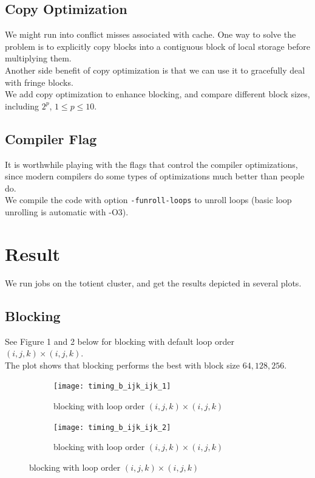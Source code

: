 \documentclass[12pt]{article}
\numberwithin{equation}{section}
\begin{document}
\subsection{Copy Optimization}

We might run into conflict misses associated with cache. One way to solve the problem is to explicitly copy blocks into a contiguous block of local storage before multiplying them.
\\
Another side benefit of copy optimization is that we can use it to gracefully deal with fringe blocks.
\\
We add copy optimization to enhance blocking, and compare different block sizes, including $2^p$, $1 \leq p \leq 10$.

\subsection{Compiler Flag}

It is worthwhile playing with the flags that control the compiler optimizations, since modern compilers do some types of optimizations much better than people do.
\\
We compile the code with option \texttt{-funroll-loops} to unroll loops (basic loop unrolling is automatic with -O3).

\section{Result}

We run jobs on the totient cluster, and get the results depicted in several plots.

\subsection{Blocking}

See Figure 1 and 2 below for blocking with default loop order $(i, j, k)\times(i, j, k)$.
\\
The plot shows that blocking performs the best with block size $64, 128, 256$.

\begin{figure}[!ht]
   \begin{subfigure}
      \centering
        \begin{center}
      \texttt{[image: timing\_b\_ijk\_ijk\_1]}
        \end{center}
      \label{aload0}
      \caption{blocking with loop order $(i, j, k)\times(i, j, k)$}
  \end{subfigure}
  \begin{subfigure}
      \centering
        \begin{center}
      \texttt{[image: timing\_b\_ijk\_ijk\_2]}
        \end{center}
      \label{aload1}
      \caption{blocking with loop order $(i, j, k)\times(i, j, k)$}
  \end{subfigure}

\end{figure}
\end{document}
